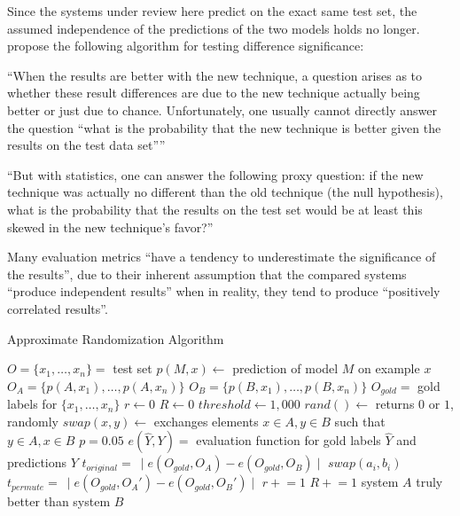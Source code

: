 Since the systems under review here predict on the exact same test set, the assumed independence
of the predictions of the two models holds no longer. \citet{morgan2005statistical} propose
the following algorithm for testing difference significance:

``When the results are better with the new technique, a question arises as to whether
these result differences are due to the new technique actually being better or just due to
chance. Unfortunately, one usually cannot directly answer the question “what is the probability
that the new technique is better given the results on the test data set”'' \citep{yeh2000more}

``But with statistics, one can answer the following proxy question: if the new technique was
actually no different than the old technique (the null hypothesis), what is the probability
that the results on the test set would be at least this skewed in the new technique’s
favor?'' \citep{yeh2000more}

Many evaluation metrics ``have a tendency to underestimate the significance of the results'',
due to their inherent assumption that the compared systems ``produce independent results''
when in reality, they tend to produce ``positively correlated results''. \citep{yeh2000more}


\begin{algorithm}
\caption{Approximate Randomization Algorithm}
\label{alg:approximate-randomization}
	\begin{algorithmic}[1]
    \STATE $O = \{x_1, \dotsc, x_n\} =$ test set
    \STATE $p(M,x) \leftarrow$ prediction of model $M$ on example $x$
    \STATE $O_A = \{p(A,x_1), \dotsc, p(A,x_n)\}$
    \STATE $O_B = \{p(B,x_1), \dotsc, p(B,x_n)\}$
    \STATE $O_{gold} =$ gold labels for $\{x_1, \dotsc, x_n\}$
    \STATE $r \leftarrow 0$
    \STATE $R \leftarrow 0$
    \STATE $threshold \leftarrow 1,000$
    \STATE $rand() \leftarrow$ returns $0$ or $1$, randomly
    \STATE $swap(x,y) \leftarrow$ exchanges elements $x \in A,y \in B$ such that $y \in A, x \in B$
    \STATE $p = 0.05$
    \STATE $e(\hat{Y},Y) =$ evaluation function for gold labels $\hat{Y}$ and predictions $Y$
    \STATE $t_{original} =\ \mid e(O_{gold},O_A) - e(O_{gold},O_B) \mid$
          \STATE $swap(a_i,b_i)$
        \ENDIF
      \ENDFOR
      \STATE $t_{permute} =\ \mid e(O_{gold},O_A') - e(O_{gold},O_B') \mid$
        \STATE $r \mathrel{+}= 1$
      \ENDIF
      \STATE $R \mathrel{+}= 1$
    \ENDWHILE
      \STATE system $A$ truly better than system $B$
    \ENDIF
  \end{algorithmic}
\end{algorithm}


